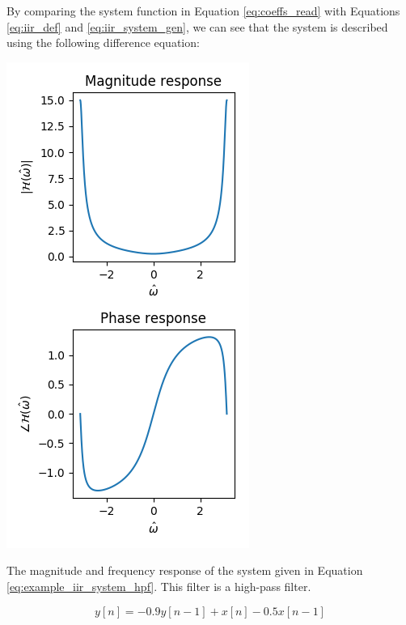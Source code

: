 By comparing the system function in Equation \ref{eq:coeffs_read} with
Equations \ref{eq:iir_def} and \ref{eq:iir_system_gen}, we can see
that the system is described using the following difference equation:
\begin{marginfigure}
\includegraphics[width=\textwidth]{code/026_iir/z_mag_angle_iir2.png}
\caption{The magnitude and frequency response of the system given in Equation \ref{eq:example_iir_system_hpf}. This filter is a high-pass filter.}
\label{fig:pz_diag2}
\end{marginfigure}
\begin{equation}
y[n] = -0.9 y[n-1] +x[n] - 0.5x[n-1]
\end{equation}

